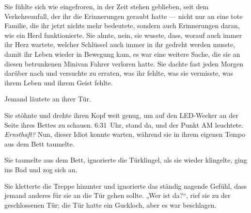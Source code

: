 Sie fühlte sich wie eingefroren, in der Zeit stehen geblieben, seit dem Verkehrsunfall, der ihr die Erinnerungen geraubt hatte — nicht nur an eine tote Familie, die ihr jetzt nichts mehr bedeutete, sondern auch Erinnerungen daran, wie ein Herd funktionierte. Sie ahnte, nein, sie wusste, dass, worauf auch immer ihr Herz wartete, welcher Schlüssel auch immer in ihr gedreht werden musste, damit ihr Leben wieder in Bewegung kam, es war eine weitere Sache, die sie an diesen betrunkenen Minivan Fahrer verloren hatte. Sie dachte fast jeden Morgen darüber nach und versuchte zu erraten, was ihr fehlte, was sie vermisste, was ihrem Leben und ihrem Geist fehlte.

Jemand läutete an ihrer Tür.

Sie stöhnte und drehte ihren Kopf weit genug, um auf den LED-Wecker an der Seite ihres Bettes zu schauen. 6:31~Uhr, stand da, und der Punkt AM leuchtete. \emph{Ernsthaft?} Nun, dieser Idiot konnte warten, während sie in ihrem eigenen Tempo aus dem Bett taumelte.

Sie taumelte aus dem Bett, ignorierte die Türklingel, als sie wieder klingelte, ging ins Bad und zog sich an.

Sie kletterte die Treppe hinunter und ignorierte das ständig nagende Gefühl, dass jemand anderes für sie an die Tür gehen sollte.
„Wer ist da?“, rief sie zu der geschlossenen Tür; die Tür hatte ein Guckloch, aber es war beschlagen.

